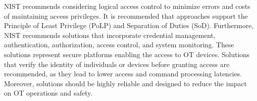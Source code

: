 NIST recommends considering logical access control to minimize errors and costs of maintaining access privileges.
It is recommended that approaches support the Principle of Least Privilege (PoLP) and Separation of Duties (SoD).
Furthermore, NIST recommends solutions that incorporate credential management, authentication, authorization, access control, and system monitoring.
These solutions represent secure platforms enabling the access to OT devices.
Solutions that verify the identity of individuals or devices before granting access are recommended, as they lead to lower access and command processing latencies.
Moreover, solutions should be highly reliable and designed to reduce the impact on OT operations and safety.






